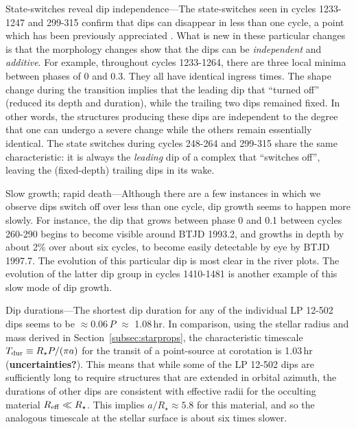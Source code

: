 \documentclass[11pt,twocolumn,tighten]{aastex63}
\begin{document}
{\sc State-switches reveal dip independence}---The state-switches seen
in cycles 1233-1247 and 299-315 confirm that dips can disappear in
less than one cycle, a point which has been previously appreciated
\citep{2017AJ....153..152S}.  What is new in these particular changes
is that the morphology changes show that the dips can be {\it
independent} and {\it additive}.  For example, throughout cycles
1233-1264, there are three local minima between phases of 0 and 0.3.
They all have identical ingress times.  The shape change during the
transition implies that the leading dip that ``turned off'' (reduced
its depth and duration), while the trailing two dips remained fixed.
In other words, the structures producing these dips are independent to
the degree that one can undergo a severe change while the others
remain essentially identical.  The state switches during cycles
248-264 and 299-315 share the same characteristic: it is always the
{\it leading} dip of a complex that ``switches off'', leaving the
(fixed-depth) trailing dips in its wake.

{\sc Slow growth; rapid death}---Although there are a few instances in
which we observe dips switch off over less than one cycle, dip
growth seems to happen more slowly.  For instance, the dip that grows
between phase 0 and 0.1 between cycles 260-290 begins to become
visible around BTJD 1993.2, and growths in depth by about 2\% over
about six cycles, to become easily detectable by eye by BTJD 1997.7.
The evolution of this particular dip is most clear in the river plots.
The evolution of the latter dip group in cycles 1410-1481 is another
example of this slow mode of dip growth.

{\sc Dip durations}---The shortest dip duration for any of the
individual LP 12-502 dips seems to be $\approx$0.06\,$P$ $\approx$
1.08\,hr.  In comparison, using the stellar radius and mass derived in
Section~\ref{subsec:starprops}, the characteristic timescale $T_{\rm
dur} \equiv R_\star P / (\pi a)$ for the transit of a point-source at
corotation is 1.03\,hr ({\bf uncertainties?}).  This means that while
some of the LP 12-502 dips are sufficiently long to require structures
that are extended in orbital azimuth, the durations of other dips are
consistent with effective radii for the occulting material $R_{\rm
eff} \ll R_\star$.  This implies $a/R_\star \approx 5.8$ for this
material, and so the analogous timescale at the stellar surface is
about six times slower.
\end{document}
